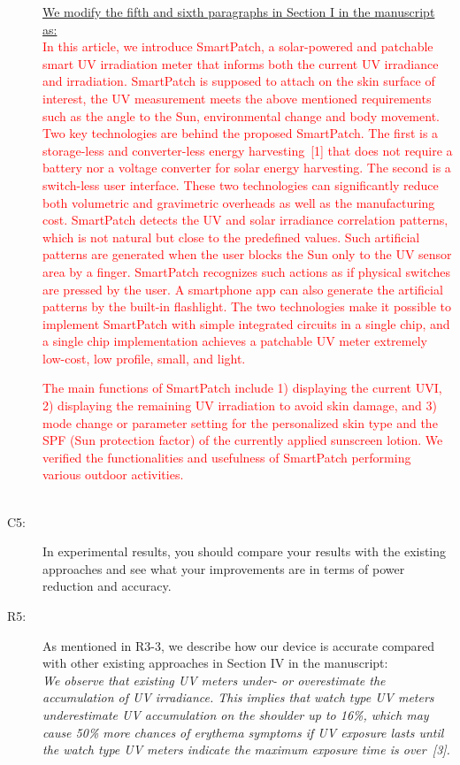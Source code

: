 \documentclass[onecolumn]{IEEEconf}
\begin{document}
\begin{description}
\underline{We modify the fifth and sixth paragraphs in Section I in the manuscript as:}\\
\textcolor{red}{In this article, we introduce SmartPatch, a solar-powered and patchable smart UV irradiation meter that informs both the current UV irradiance and irradiation. SmartPatch is supposed to attach on the skin surface of interest, the UV measurement meets the above mentioned requirements such as the angle to the Sun, environmental change and body movement. Two key technologies are behind the proposed SmartPatch. The first is a storage-less and converter-less energy harvesting~[1] that does not require a battery nor a voltage converter for solar energy harvesting. The second is a switch-less user interface. These two technologies can significantly reduce both volumetric and gravimetric overheads as well as the manufacturing cost.
SmartPatch detects the UV and solar irradiance correlation patterns, which is not natural but close to the predefined values. Such artificial patterns are generated when the user blocks the Sun only to the UV sensor area by a finger. SmartPatch recognizes such actions as if physical switches are pressed by the user. A smartphone app can also generate the artificial patterns by the built-in flashlight. The two technologies make it possible to implement SmartPatch with simple integrated circuits in a single chip, and a single chip implementation achieves a patchable UV meter extremely low-cost, low profile, small, and light.}

\textcolor{red}{The main functions of SmartPatch include 1) displaying the current UVI, 2) displaying the remaining UV irradiation to avoid skin damage, and 3) mode change or parameter setting for the personalized skin type and the SPF (Sun protection factor) of the currently applied sunscreen lotion. We verified the functionalities and usefulness of SmartPatch performing various outdoor activities.}\\
~\\

\item [C5: ] In experimental results, you should compare your results with the existing approaches and see what your improvements are in terms of power reduction and accuracy.
\item [R5: ] As mentioned in R3-3, we describe how our device is accurate compared with other existing approaches in Section IV in the manuscript:\\

\textit{We observe that existing UV meters under- or overestimate the accumulation of UV irradiance.
This implies that watch type UV meters underestimate UV accumulation on the shoulder up to 16\%, which may cause 50\% more chances of erythema symptoms if UV exposure lasts until the watch type UV meters indicate the maximum exposure time is over~[3].}\\


\end{description}
\end{document}
